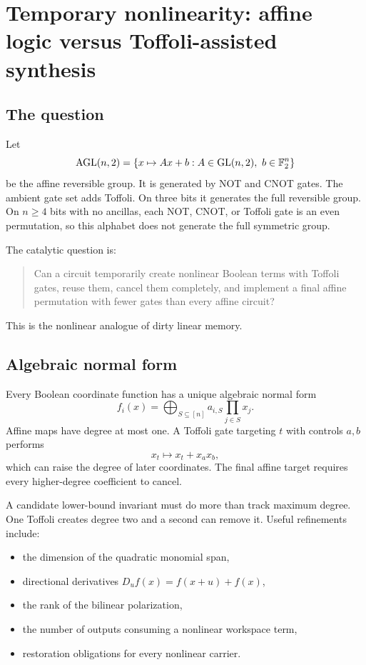 \chapter{Temporary nonlinearity: affine logic versus Toffoli-assisted synthesis}\label{ch:affine-toffoli}


\section{The question}
Let
\[
\operatorname{AGL}(n,2)
=
\{x\mapsto Ax+b:A\in\operatorname{GL}(n,2),\ b\in\mathbb F_2^n\}
\]
be the affine reversible group.  It is generated by NOT and CNOT gates.  The ambient gate set adds Toffoli.  On three bits it generates the full reversible group.  On $n\ge4$ bits with no ancillas, each NOT, CNOT, or Toffoli gate is an even permutation, so this alphabet does not generate the full symmetric group.

The catalytic question is:
\begin{quote}
Can a circuit temporarily create nonlinear Boolean terms with Toffoli gates, reuse them, cancel them completely, and implement a final affine permutation with fewer gates than every affine circuit?
\end{quote}
This is the nonlinear analogue of dirty linear memory.

\section{Algebraic normal form}
Every Boolean coordinate function has a unique algebraic normal form
\[
f_i(x)
=
\bigoplus_{S\subseteq[n]}a_{i,S}\prod_{j\in S}x_j.
\]
Affine maps have degree at most one.  A Toffoli gate targeting $t$ with controls $a,b$ performs
\[
x_t\longmapsto x_t+x_ax_b,
\]
which can raise the degree of later coordinates.  The final affine target requires every higher-degree coefficient to cancel.

A candidate lower-bound invariant must do more than track maximum degree.  One Toffoli creates degree two and a second can remove it.  Useful refinements include:
\begin{itemize}
\item the dimension of the quadratic monomial span,
\item directional derivatives $D_u f(x)=f(x+u)+f(x)$,
\item the rank of the bilinear polarization,
\item the number of outputs consuming a nonlinear workspace term,
\item restoration obligations for every nonlinear carrier.
\end{itemize}


